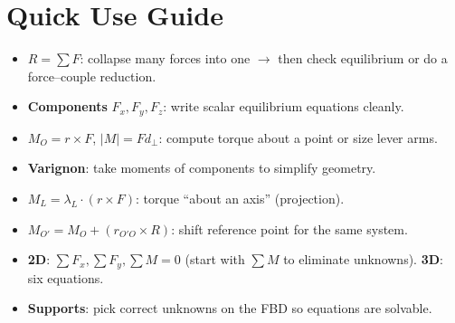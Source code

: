 \documentclass[10pt]{article}
\begin{document}
\section{Quick Use Guide}
\begin{itemize}
    \item $R = \sum F$: collapse many forces into one $\rightarrow$ then check equilibrium or do a force--couple reduction.
    \item \textbf{Components} $F_x,F_y,F_z$: write scalar equilibrium equations cleanly.
    \item $M_O = r \times F$, $|M| = F d_{\perp}$: compute torque about a point or size lever arms.
    \item \textbf{Varignon}: take moments of components to simplify geometry.
    \item $M_L = \lambda_L \cdot (r \times F)$: torque ``about an axis'' (projection).
    \item $M_{O'} = M_O + (r_{O'O} \times R)$: shift reference point for the same system.
    \item \textbf{2D}: $\sum F_x,\sum F_y,\sum M=0$ (start with $\sum M$ to eliminate unknowns). \textbf{3D}: six equations.
    \item \textbf{Supports}: pick correct unknowns on the FBD so equations are solvable.
\end{itemize}
\end{document}

